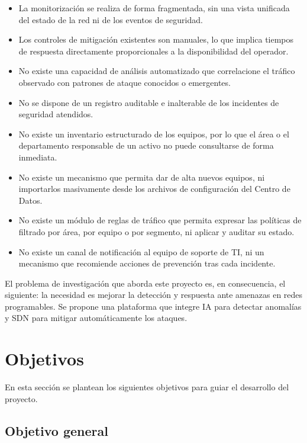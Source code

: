 \begin{itemize}
    \item La monitorizaci\'on se realiza de forma fragmentada, sin una vista unificada del estado de la red ni de los eventos de seguridad.
    \item Los controles de mitigaci\'on existentes son manuales, lo que implica tiempos de respuesta directamente proporcionales a la disponibilidad del operador.
    \item No existe una capacidad de an\'alisis automatizado que correlacione el tr\'afico observado con patrones de ataque conocidos o emergentes.
    \item No se dispone de un registro auditable e inalterable de los incidentes de seguridad atendidos.
    \item No existe un inventario estructurado de los equipos, por lo que el \'area o el departamento responsable de un activo no puede consultarse de forma inmediata.
    \item No existe un mecanismo que permita dar de alta nuevos equipos, ni importarlos masivamente desde los archivos de configuraci\'on del Centro de Datos.
    \item No existe un m\'odulo de reglas de tr\'afico que permita expresar las pol\'iticas de filtrado por \'area, por equipo o por segmento, ni aplicar y auditar su estado.
    \item No existe un canal de notificaci\'on al equipo de soporte de TI, ni un mecanismo que recomiende acciones de prevenci\'on tras cada incidente.
\end{itemize}

El problema de investigaci\'on que aborda este proyecto es, en consecuencia, el siguiente: la necesidad es mejorar la detecci\'on y respuesta ante amenazas en redes programables. Se propone una plataforma que integre IA para detectar anomalías y SDN para mitigar autom\'aticamente los ataques.

\section{Objetivos}

En esta secci\'on se plantean los siguientes objetivos para guiar el desarrollo del proyecto.

\subsection{Objetivo general}

